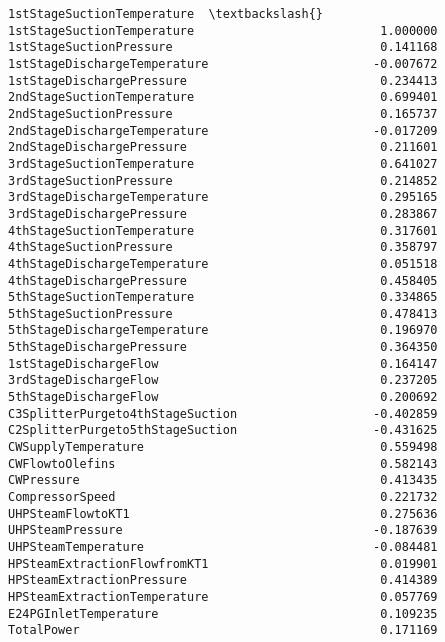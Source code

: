 \documentclass[11pt]{article}
\makeatletter
\newcommand{\boxspacing}{\kern\kvtcb@left@rule\kern\kvtcb@boxsep}
\newcommand{\prompt}[4]{
        \ttfamily\llap{{\color{#2}[#3]:\hspace{3pt}#4}}\vspace{-\baselineskip}
    }
\makeatother
\begin{document}
            \begin{tcolorbox}[breakable, size=fbox, boxrule=.5pt, pad at break*=1mm, opacityfill=0]
\prompt{Out}{outcolor}{29}{\boxspacing}
\begin{Verbatim}[commandchars=\\\{\}]
                                  1stStageSuctionTemperature  \textbackslash{}
1stStageSuctionTemperature                          1.000000
1stStageSuctionPressure                             0.141168
1stStageDischargeTemperature                       -0.007672
1stStageDischargePressure                           0.234413
2ndStageSuctionTemperature                          0.699401
2ndStageSuctionPressure                             0.165737
2ndStageDischargeTemperature                       -0.017209
2ndStageDischargePressure                           0.211601
3rdStageSuctionTemperature                          0.641027
3rdStageSuctionPressure                             0.214852
3rdStageDischargeTemperature                        0.295165
3rdStageDischargePressure                           0.283867
4thStageSuctionTemperature                          0.317601
4thStageSuctionPressure                             0.358797
4thStageDischargeTemperature                        0.051518
4thStageDischargePressure                           0.458405
5thStageSuctionTemperature                          0.334865
5thStageSuctionPressure                             0.478413
5thStageDischargeTemperature                        0.196970
5thStageDischargePressure                           0.364350
1stStageDischargeFlow                               0.164147
3rdStageDischargeFlow                               0.237205
5thStageDischargeFlow                               0.200692
C3SplitterPurgeto4thStageSuction                   -0.402859
C2SplitterPurgeto5thStageSuction                   -0.431625
CWSupplyTemperature                                 0.559498
CWFlowtoOlefins                                     0.582143
CWPressure                                          0.413435
CompressorSpeed                                     0.221732
UHPSteamFlowtoKT1                                   0.275636
UHPSteamPressure                                   -0.187639
UHPSteamTemperature                                -0.084481
HPSteamExtractionFlowfromKT1                        0.019901
HPSteamExtractionPressure                           0.414389
HPSteamExtractionTemperature                        0.057769
E24PGInletTemperature                               0.109235
TotalPower                                          0.171169


\end{Verbatim}
\end{tcolorbox}
\end{document}
